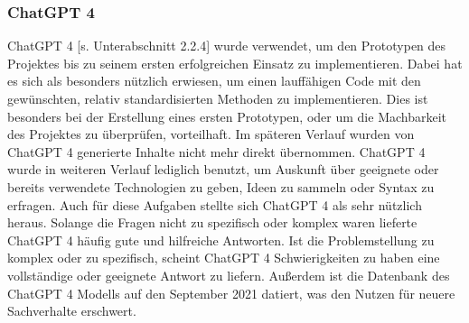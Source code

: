 \subsubsection{ChatGPT 4}
ChatGPT 4 [s. Unterabschnitt 2.2.4] wurde verwendet, um den Prototypen des Projektes bis zu seinem ersten erfolgreichen Einsatz zu implementieren. Dabei hat es sich als besonders nützlich erwiesen, um einen lauffähigen Code mit den gewünschten, relativ standardisierten Methoden zu implementieren. Dies ist besonders bei der Erstellung eines ersten Prototypen, oder um die Machbarkeit des Projektes zu überprüfen, vorteilhaft. Im späteren Verlauf wurden von ChatGPT 4 generierte Inhalte nicht mehr direkt übernommen. ChatGPT 4 wurde in weiteren Verlauf lediglich benutzt, um Auskunft über geeignete oder bereits verwendete Technologien zu geben, Ideen zu sammeln oder Syntax zu erfragen. Auch für diese Aufgaben stellte sich ChatGPT 4 als sehr nützlich heraus. Solange die Fragen nicht zu spezifisch oder komplex waren lieferte ChatGPT 4 häufig gute und hilfreiche Antworten. Ist die Problemstellung zu komplex oder zu spezifisch, scheint ChatGPT 4 Schwierigkeiten zu haben eine vollständige oder geeignete Antwort zu liefern. Außerdem ist die Datenbank des ChatGPT 4 Modells auf den September 2021 datiert, was den Nutzen für neuere Sachverhalte erschwert.